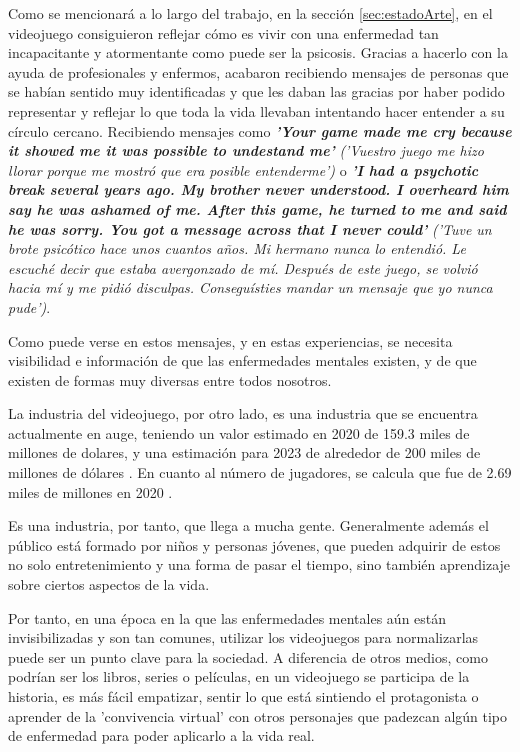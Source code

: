 \documentclass[12pt, a4paper,twoside,titlepage]{book}
\begin{document}
Como se mencionará a lo largo del trabajo, en la sección \ref{sec:estadoArte}, en el videojuego  consiguieron reflejar cómo es vivir con una enfermedad tan incapacitante y atormentante como puede ser la psicosis. Gracias a hacerlo con la ayuda de profesionales y enfermos, acabaron recibiendo mensajes de personas que se habían sentido muy identificadas y que les daban las gracias por haber podido representar y reflejar lo que toda la vida llevaban intentando hacer entender a su círculo cercano. Recibiendo mensajes como \textbf{\textit{'Your game made me cry because it showed me it was possible to undestand me'}} \textit{('Vuestro juego me hizo llorar porque me mostró que era posible entenderme')} o \textbf{\textit{'I had a psychotic break several years ago. My brother never understood. I overheard him say he was ashamed of me. After this game, he turned to me and said he was sorry. You got a message across that I never could'}} \textit{('Tuve un brote psicótico hace unos cuantos años. Mi hermano nunca lo entendió. Le escuché decir que estaba avergonzado de mí. Después de este juego, se volvió hacia mí y me pidió disculpas. Conseguísties mandar un mensaje que yo nunca pude')}. 

Como puede verse en estos mensajes, y en estas experiencias, se necesita visibilidad e información de que las enfermedades mentales existen, y de que existen de formas muy diversas entre todos nosotros. 

La industria del videojuego, por otro lado, es una industria que se encuentra actualmente en auge, teniendo un valor estimado en 2020 de 159.3 miles de millones de dolares, y una estimación para 2023 de alrededor de 200 miles de millones de dólares \cite{articuloIntroVideojuegos}. En cuanto al número de jugadores, se calcula que fue de 2.69 miles de millones en 2020 \cite{articuloIntroVideojuegos2}. 

Es una industria, por tanto, que llega a mucha gente. Generalmente además el público está formado por niños y personas jóvenes, que pueden adquirir de estos no solo entretenimiento y una forma de pasar el tiempo, sino también aprendizaje sobre ciertos aspectos de la vida. 

Por tanto, en una época en la que las enfermedades mentales aún están invisibilizadas y son tan comunes, utilizar los videojuegos para normalizarlas puede ser un punto clave para la sociedad. A diferencia de otros medios, como podrían ser los libros, series o películas, en un videojuego se participa de la historia, es más fácil empatizar, sentir lo que está sintiendo el protagonista o aprender de la 'convivencia virtual' con otros personajes que padezcan algún tipo de enfermedad para poder aplicarlo a la vida real. 
\end{document}
